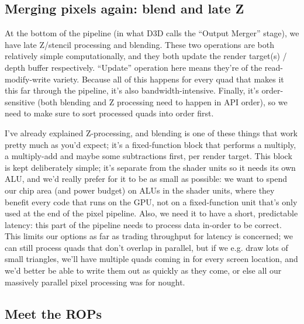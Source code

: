 \documentclass[12pt]{article}
\begin{document}
\subsection{Merging pixels again: blend and late Z}
\label{sec:org5453934}

At the bottom of the pipeline (in what D3D calls the “Output Merger” stage), we have late Z/stencil processing and blending. These two operations are both relatively simple computationally, and they both update the render target(s) / depth buffer respectively. “Update” operation here means they’re of the read-modify-write variety. Because all of this happens for every quad that makes it this far through the pipeline, it’s also bandwidth-intensive. Finally, it’s order-sensitive (both blending and Z processing need to happen in API order), so we need to make sure to sort processed quads into order first.

I’ve already explained Z-processing, and blending is one of these things that work pretty much as you’d expect; it’s a fixed-function block that performs a multiply, a multiply-add and maybe some subtractions first, per render target. This block is kept deliberately simple; it’s separate from the shader units so it needs its own ALU, and we’d really prefer for it to be as small as possible: we want to spend our chip area (and power budget) on ALUs in the shader units, where they benefit every code that runs on the GPU, not on a fixed-function unit that’s only used at the end of the pixel pipeline. Also, we need it to have a short, predictable latency: this part of the pipeline needs to process data in-order to be correct. This limits our options as far as trading throughput for latency is concerned; we can still process quads that don’t overlap in parallel, but if we e.g. draw lots of small triangles, we’ll have multiple quads coming in for every screen location, and we’d better be able to write them out as quickly as they come, or else all our massively parallel pixel processing was for nought.

\subsection{Meet the ROPs}
\label{sec:orgd6f1a7f}
\end{document}
